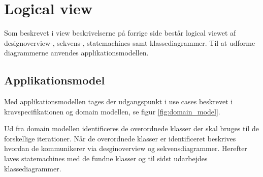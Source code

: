 \section{Logical view}

Som beskrevet i view beskrivelserne på forrige side består logical viewet af designoverview-, sekvens-, statemachines samt klassediagrammer. Til at udforme diagrammerne anvendes applikationsmodellen.

\subsection{Applikationsmodel}
Med applikationsmodellen tages der udgangspunkt i use cases beskrevet i kravspecifikationen og domain modellen, se figur \ref{fig:domain_model}.
  
Ud fra domain modellen identificeres de overordnede klasser der skal bruges til de forskellige iterationer. Når de overordnede klasser er identificeret beskrives hvordan de kommunikerer via desginoverview og sekvensdiagrammer. Herefter laves statemachines med de fundne klasser og til sidst udarbejdes klassediagrammer.

\newpage


\newpage


\newpage


\newpage

